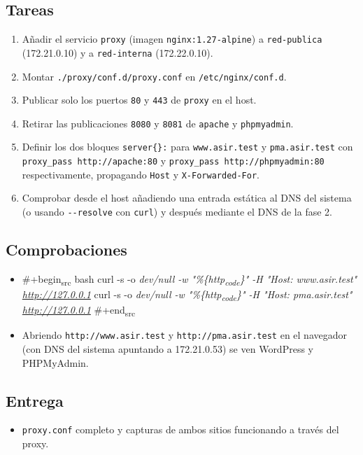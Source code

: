 \documentclass[11pt]{article}
\begin{document}
\subsection{Tareas}
\label{sec:org000004e}
\begin{enumerate}
\item Añadir el servicio \texttt{proxy} (imagen \texttt{nginx:1.27-alpine}) a \texttt{red-publica}
(172.21.0.10) y a \texttt{red-interna} (172.22.0.10).
\item Montar \texttt{./proxy/conf.d/proxy.conf} en \texttt{/etc/nginx/conf.d}.
\item Publicar solo los puertos \texttt{80} y \texttt{443} de \texttt{proxy} en el host.
\item Retirar las publicaciones \texttt{8080} y \texttt{8081} de \texttt{apache} y \texttt{phpmyadmin}.
\item Definir los dos bloques \texttt{server\{\}:} para \texttt{www.asir.test} y \texttt{pma.asir.test} con
\texttt{proxy\_pass http://apache:80} y \texttt{proxy\_pass http://phpmyadmin:80}
respectivamente, propagando \texttt{Host} y \texttt{X-Forwarded-For}.
\item Comprobar desde el host añadiendo una entrada estática al DNS del sistema
(o usando \texttt{-{}-{}resolve} con \texttt{curl}) y después mediante el DNS de la fase 2.
\end{enumerate}
\subsection{Comprobaciones}
\label{sec:org0000051}
\begin{itemize}
\item \#+begin\textsubscript{src} bash
curl -s -o \emph{dev/null -w "\%\{http\textsubscript{code}\}\n" -H "Host: www.asir.test" \url{http://127.0.0.1}}
curl -s -o \emph{dev/null -w "\%\{http\textsubscript{code}\}\n" -H "Host: pma.asir.test" \url{http://127.0.0.1}}
\#+end\textsubscript{src}
\item Abriendo \texttt{http://www.asir.test} y \texttt{http://pma.asir.test} en el navegador (con
DNS del sistema apuntando a 172.21.0.53) se ven WordPress y PHPMyAdmin.
\end{itemize}
\subsection{Entrega}
\label{sec:org0000054}
\begin{itemize}
\item \texttt{proxy.conf} completo y capturas de ambos sitios funcionando a través del proxy.
\end{itemize}
\end{document}
